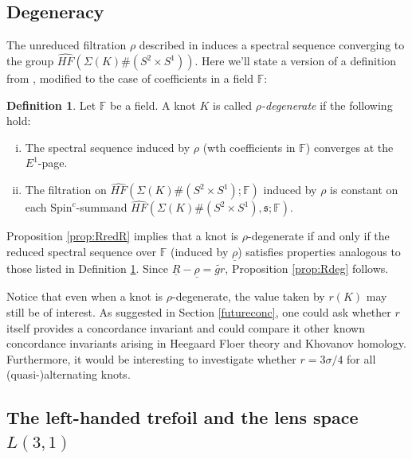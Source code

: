 \documentclass[11pt]{article}
\theoremstyle{plain} \newtheorem{thm}{Theorem}[subsection]
\theoremstyle{plain} \newtheorem{cor}[thm]{Corollary}
\theoremstyle{plain} \newtheorem{prop}[thm]{Proposition}
\theoremstyle{plain} \newtheorem{conj}[thm]{Conjecture}
\theoremstyle{plain} \newtheorem{lem}[thm]{Lemma}
\theoremstyle{definition} \newtheorem{df}[thm]{Definition}
\theoremstyle{remark} \newtheorem{rmk}[thm]{Remark}
\theoremstyle{remark} \newtheorem{obs}[thm]{Observation}
\newcommand{\DBCs}[1]{\Sigma(#1)\#(S^{2}\times S^{1})}
\newcommand{\red}[1]{\underline{#1}}
\numberwithin{equation}{section}
\begin{document}
\subsection{Degeneracy}

The unreduced filtration $\rho$ described in \cite{et:R} induces a spectral sequence converging to the group $\widehat{HF}(\DBCs{K})$.  Here we'll state a version of a definition from \cite{et:R}, modified to the case of coefficients in a field $\mathbb{F}$:

\begin{df}\label{def:deg}
Let $\mathbb{F}$ be a field.  A knot $K$ is called \textit{$\rho$-degenerate} if the following hold:
\begin{enumerate}[(i)]
\item The spectral sequence induced by $\rho$ (wth coefficients in $\mathbb{F}$) converges at the $E^{1}$-page.
\item The filtration on $\widehat{HF}(\DBCs{K}; \mathbb{F})$ induced by $\rho$ is constant on each $\text{Spin}^c$-summand $\widehat{HF}(\DBCs{K}, \mathfrak{s}; \mathbb{F})$.
\end{enumerate}
\end{df}

Proposition \ref{prop:RredR} implies that a knot is $\rho$-degenerate if and only if the reduced spectral sequence over $\mathbb{F}$ (induced by $\red{\rho}$) satisfies properties analogous to those listed in Definition \ref{def:deg}.  Since $\red{R} - \red{\rho} = \widetilde{gr}$, Proposition \ref{prop:Rdeg} follows.

Notice that even when a knot is $\rho$-degenerate, the value taken by $r(K)$ may still be of interest.  As suggested in Section \ref{futureconc}, one could ask whether $r$ itself provides a concordance invariant and could compare it other known concordance invariants arising in Heegaard Floer theory and Khovanov homology.  Furthermore, it would be interesting to investigate whether $r = 3\sigma/4$ for all (quasi-)alternating knots.

\subsection{The left-handed trefoil and the lens space $L(3,1)$}\label{sec:example}
\end{document}
